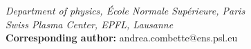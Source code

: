 \documentclass[11pt,openany]{report}
\begin{document}
\begin{titlepage}
{{{{{                    }}


                \raggedright \emph{\scriptsize{Department of physics, École Normale Supérieure, Paris} \\
                    \scriptsize{Swiss Plasma Center, EPFL, Lausanne}} \\

                \textbf{Corresponding author:} andrea.combette@ens.psl.eu
            }}
    }
    \begin{multicols}{2}

        \renewcommand{\baselinestretch}{1.13}\normalsize %
        {\footnotesize \sffamily \tableofcontents} %



        \renewcommand{\baselinestretch}{1.0}\normalsize
        \newpage

    \end{multicols}
\end{titlepage}

\fontsize{9}{10}\selectfont
\end{document}
